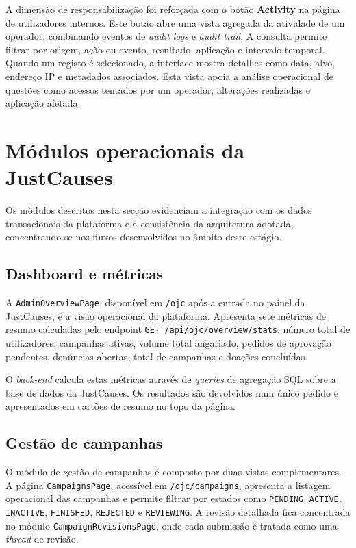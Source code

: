 A dimensão de responsabilização foi reforçada com o botão \textbf{Activity} na página de utilizadores internos. Este botão abre uma vista agregada da atividade de um operador, combinando eventos de \textit{audit logs} e \textit{audit trail}. A consulta permite filtrar por origem, ação ou evento, resultado, aplicação e intervalo temporal. Quando um registo é selecionado, a interface mostra detalhes como data, alvo, endereço IP e metadados associados. Esta vista apoia a análise operacional de questões como acessos tentados por um operador, alterações realizadas e aplicação afetada.


\section{Módulos operacionais da JustCauses}
\label{sec:modulos_ojc}

Os módulos descritos nesta secção evidenciam a integração com os dados transacionais da plataforma e a consistência da arquitetura adotada, concentrando-se nos fluxos desenvolvidos no âmbito deste estágio.

\subsection{Dashboard e métricas}
\label{subsec:impl_dashboard}

A \texttt{AdminOverviewPage}, disponível em \texttt{/ojc} após a entrada no painel da JustCauses, é a visão operacional da plataforma. Apresenta sete métricas de resumo calculadas pelo endpoint \texttt{GET /api/ojc/overview/stats}: número total de utilizadores, campanhas ativas, volume total angariado, pedidos de aprovação pendentes, denúncias abertas, total de campanhas e doações concluídas.

O \textit{back-end} calcula estas métricas através de \textit{queries} de agregação SQL sobre a base de dados da JustCauses. Os resultados são devolvidos num único pedido e apresentados em cartões de resumo no topo da página.

\subsection{Gestão de campanhas}
\label{subsec:impl_campaigns}

O módulo de gestão de campanhas é composto por duas vistas complementares. A página \texttt{CampaignsPage}, acessível em \texttt{/ojc/campaigns}, apresenta a listagem operacional das campanhas e permite filtrar por estados como \texttt{PENDING}, \texttt{ACTIVE}, \texttt{INACTIVE}, \texttt{FINISHED}, \texttt{REJECTED} e \texttt{REVIEWING}. A revisão detalhada fica concentrada no módulo \texttt{CampaignRevisionsPage}, onde cada submissão é tratada como uma \textit{thread} de revisão.

